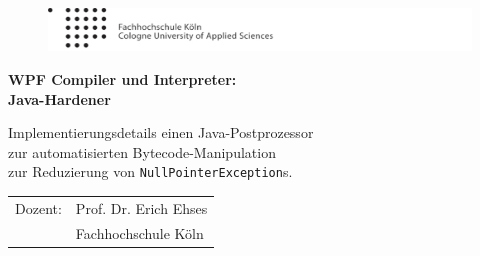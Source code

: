 %

 



\frontmatter 

\begin{center}

\begin{figure}[!ht]
	\centering
		\includegraphics[natwidth=920pt, natheight=95pt, width=1.0\textwidth]{tex/logoheader.pdf}
\end{figure}

\vspace{5.0cm}

\begin{Huge}
	\textbf{WPF Compiler und Interpreter:}\\
	\vspace{0.1cm}
	\textbf{Java-Hardener}\\
\end{Huge}

\vspace{0.8cm}

\begin{LARGE}
	Implementierungsdetails einen Java-Postprozessor\\
	\vspace{0.1cm}
	zur automatisierten Bytecode-Manipulation\\
	\vspace{0.1cm}
	zur Reduzierung von \texttt{NullPointerException}s.\\
\end{LARGE}

\vspace{2.5cm}

\begin{tabular}{rl}
        Dozent:  &  Prof. Dr. Erich Ehses\\
       			 &  \small Fachhochschule Köln \\[1.0em]
\end{tabular}


\end{center}
